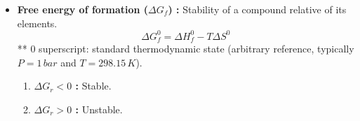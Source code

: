\documentclass[a4paper,11pt]{article}
\begin{document}
\begin{enumerate}
        \begin{itemize}
        \item \textbf{Free energy of formation
        ($\Delta G_f$) : } Stability of a compound relative of its elements.
            \[\Delta G^0_f = \Delta H^0_f - T \Delta S^0\]
            ** 0 superscript: standard thermodynamic state (arbitrary reference, typically $P=1\,bar$ and $T=298.15\,K$).
            \begin{enumerate}
                \item \textbf{$\Delta G_r < 0$ :} Stable.
                \item \textbf{$\Delta G_r > 0$ :} Unstable.
            \end{enumerate}
        \end{itemize}    
\end{enumerate}
\end{document}
